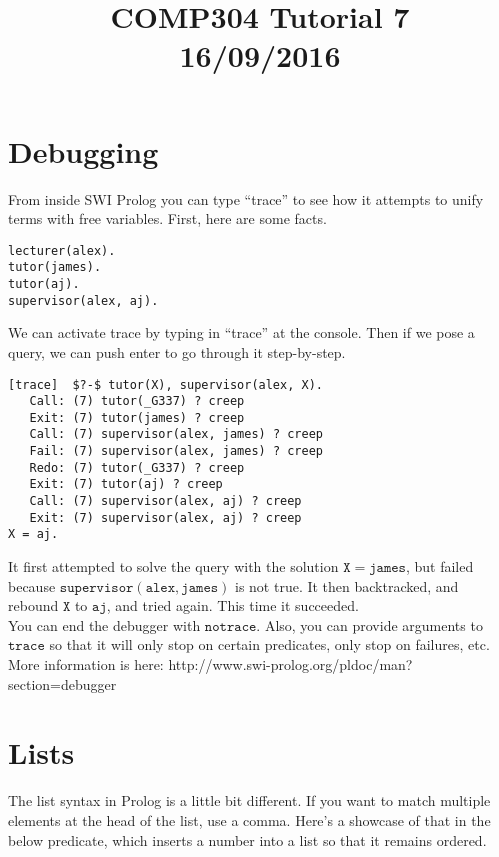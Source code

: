 \documentclass[a4paper,12pt]{article}
\newcommand{\kwa}[1]{\mathtt{#1}}
\begin{document}
\title{COMP304 Tutorial 7 \\ 16/09/2016}
\date{}
\maketitle

\section{Debugging}

\noindent
From inside SWI Prolog you can type ``trace'' to see how it attempts to unify terms with free variables. First, here are some facts.


\begin{lstlisting}
lecturer(alex).
tutor(james).
tutor(aj).
supervisor(alex, aj).
\end{lstlisting}

\noindent
We can activate trace by typing in ``trace'' at the console. Then if we pose a query, we can push enter to go through it step-by-step.

\begin{lstlisting}
[trace]  $?-$ tutor(X), supervisor(alex, X).
   Call: (7) tutor(_G337) ? creep
   Exit: (7) tutor(james) ? creep
   Call: (7) supervisor(alex, james) ? creep
   Fail: (7) supervisor(alex, james) ? creep
   Redo: (7) tutor(_G337) ? creep
   Exit: (7) tutor(aj) ? creep
   Call: (7) supervisor(alex, aj) ? creep
   Exit: (7) supervisor(alex, aj) ? creep
X = aj.
\end{lstlisting}

\noindent
It first attempted to solve the query with the solution $\kwa{X = james}$, but failed because $\kwa{supervisor(alex, james)}$ is not true. It then backtracked, and rebound $\kwa{X}$ to $\kwa{aj}$, and tried again. This time it succeeded. \\

\noindent
You can end the debugger with $\kwa{notrace}$. Also, you can provide arguments to $\kwa{trace}$ so that it will only stop on certain predicates, only stop on failures, etc. More information is here:
http://www.swi-prolog.org/pldoc/man?section=debugger


\section{Lists}

The list syntax in Prolog is a little bit different. If you want to match multiple elements at the head of the list, use a comma. Here's a showcase of that in the below predicate, which inserts a number into a list so that it remains ordered.
\end{document}
